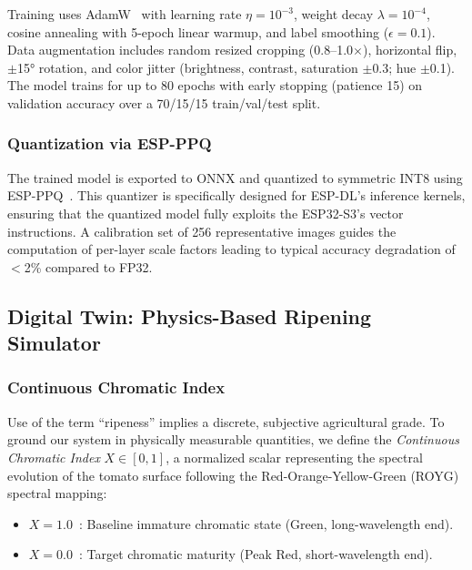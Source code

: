 \documentclass[conference]{IEEEtran}
\begin{document}
    Training uses AdamW~\cite{loshchilov2019adamw} with learning rate $\eta = 10^{-3}$, weight decay $\lambda = 10^{-4}$, cosine annealing with 5-epoch linear warmup, and label smoothing ($\epsilon = 0.1$). Data augmentation includes random resized cropping (0.8--1.0$\times$), horizontal flip, $\pm$15° rotation, and color jitter (brightness, contrast, saturation $\pm$0.3; hue $\pm$0.1). The model trains for up to 80 epochs with early stopping (patience 15) on validation accuracy over a 70/15/15 train/val/test split.

    \subsubsection{Quantization via ESP-PPQ}

    The trained model is exported to ONNX and quantized to symmetric INT8 using ESP-PPQ~\cite{espdl2024}. This quantizer is specifically designed for ESP-DL's inference kernels, ensuring that the quantized model fully exploits the ESP32-S3's vector instructions. A calibration set of 256 representative images guides the computation of per-layer scale factors leading to typical accuracy degradation of $<$2\% compared to FP32.

    \subsection{Digital Twin: Physics-Based Ripening Simulator}

    \subsubsection{Continuous Chromatic Index}
    \label{sec:chromatic_index}

    Use of the term ``ripeness'' implies a discrete, subjective agricultural grade.  To ground our system in physically measurable quantities, we define the \textit{Continuous Chromatic Index} $X \in [0, 1]$, a normalized scalar representing the spectral evolution of the tomato surface following the Red-Orange-Yellow-Green (ROYG) spectral mapping:

    \begin{itemize}
        \item $X = 1.0$~: Baseline immature chromatic state (Green, long-wavelength end).
        \item $X = 0.0$~: Target chromatic maturity (Peak Red, short-wavelength end).
    \end{itemize}
\end{document}
